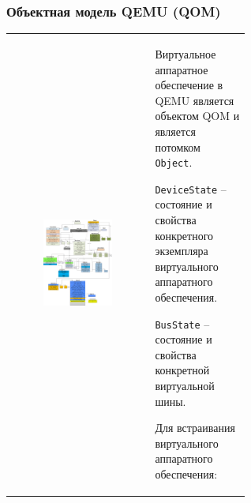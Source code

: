 \begin{frame}%
    \frametitle{Объектная модель QEMU (QOM)}
    {\fontsize{6.7pt}{8pt}\selectfont
        \begin{tabularx}{\linewidth}{ p{0.6\linewidth} X }
            \begin{figure}[!htbp]
                \includegraphics[width=\linewidth,valign=t]{images/qom-hierarchy_upscaled.png}
            \end{figure}
            &
            Виртуальное аппаратное обеспечение в QEMU является объектом QOM и является потомком
            \texttt{Object}.

            \texttt{DeviceState} -- состояние и свойства конкретного экземпляра виртуального аппаратного обеспечения.

            \texttt{BusState} -- состояние и свойства конкретной виртуальной шины.

            Для встраивания виртуального аппаратного обеспечения:


\end{tabularx}}
\end{frame}
